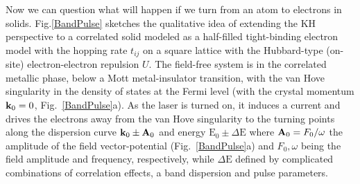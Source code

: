Now we can question what will happen if we turn from an atom to electrons in solids. Fig.\ref{BandPulse} sketches the qualitative idea of extending the KH
perspective to a correlated solid modeled as a half-filled tight-binding electron model with the 
hopping rate $t_{ij}$ on a square lattice with the Hubbard-type (on-site) electron-electron repulsion $U$.
The field-free system is in the correlated metallic phase\cite{RevModPhys.68.13}, below a Mott metal-insulator transition, with the van Hove singularity 
in the density of states at the Fermi level (with the crystal momentum 
${\bf k}_0=0$, Fig.~\ref{BandPulse}a).
As the laser is turned on, it induces a current and drives the 
electrons away from the van Hove singularity to the turning
points along the dispersion curve ${\bf k}_{0} \pm {\bf A}_0$ and energy $\text{E}_{0}\pm\Delta\text{E}$ 
where
${\bf A}_0=F_0/\omega$ the amplitude of the field vector-potential
(Fig.~\ref{BandPulse}a) and $F_0, \omega$ being the field amplitude and
frequency, respectively, while $\Delta\text{E}$ defined by complicated combinations of correlation effects, a band dispersion and pulse parameters.






